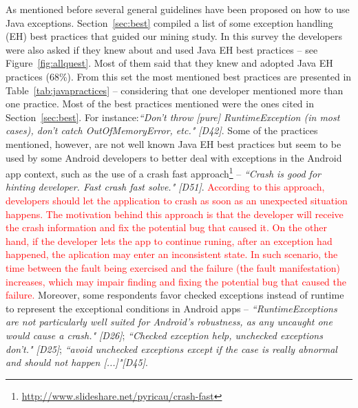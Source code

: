 As mentioned before several general guidelines have been proposed on how to
use Java exceptions. Section~\ref{sec:best}  compiled a list of some exception handling (EH) best practices that guided our mining study. In this survey the developers were also asked if they knew about and used Java EH best practices -- see Figure~\ref{fig:allquest}. Most of them said that they knew and adopted Java EH practices (68\%). From this set the most mentioned best practices are presented in Table~\ref{tab:javapractices} -- considering that one developer mentioned more than one practice. Most of the best practices mentioned were the ones cited in Section~\ref{sec:best}. For instance:\emph{``Don't throw [pure] RuntimeException (in most cases), don't catch OutOfMemoryError, etc." [D42]}.  Some of the practices mentioned, however, are not well known Java EH best practices but seem to be used by some Android developers to better deal with exceptions in the Android app context, such as the use of a crash fast approach\footnote{\url{http://www.slideshare.net/pyricau/crash-fast}} -- \emph{``Crash is good for hinting developer. Fast crash fast solve." [D51]}. \textcolor{red}{According to this approach, developers should let the application to crash as soon as an unexpected situation happens. The motivation behind this approach is that the developer will receive the crash information and fix the potential bug that caused it. On the other hand, if the developer lets the app to continue runing, after an exception had happened, the aplication may enter an inconsistent state. In such scenario, the time between the fault being exercised and the failure (the fault manifestation) increases, which may impair finding and fixing the potential bug that caused the failure.} Moreover, some respondents favor checked exceptions instead of runtime to represent the exceptional conditions in Android apps -- \emph{``RuntimeExceptions are not particularly well suited for Android's robustness, as any uncaught one would cause a crash." [D26]}; \emph{``Checked exception help, unchecked exceptions don't." [D25]}; \emph{``avoid unchecked exceptions except if the case is really abnormal and should not happen [...]"[D45]}.


